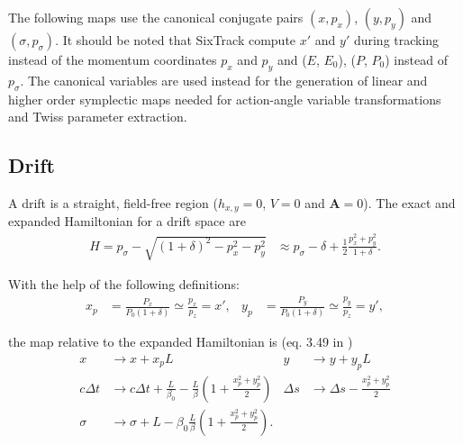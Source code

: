 \documentclass[english]{article}
\begin{document}
The following maps use the canonical conjugate pairs $(x,p_x)$, $(y,p_y)$ 
and $(\sigma,p_\sigma)$. It should be noted that SixTrack compute $x'$ and $y'$
during tracking instead of the momentum coordinates $p_x$ and $p_y$ and ($E$,
$E_0$), ($P$, $P_0$) instead of $p_\sigma$. The canonical variables are
used instead for the generation of linear and higher order symplectic maps
needed for action-angle variable transformations and Twiss parameter extraction.


\subsection{Drift}
A drift is a straight, field-free region ($h_{x,y}=0$, $V=0$ and
$\mathbf{A}=0$).  The exact and expanded Hamiltonian for a drift space are
\begin{align}
  H = p_\sigma - \sqrt{(1+\delta)^2 - p_x^2 - p_y^2} &\approx
  p_\sigma - \delta + \frac{1}{2}\frac{p_x^2+p_y^2}{1+\delta}.
\end{align}

With the help of the following definitions:
\begin{align}
   x_p&=\frac{P_x}{P_0 (1+\delta)}\simeq\frac{p_x}{p_z}=x', &
   y_p&=\frac{P_y}{P_0 (1+\delta)}\simeq\frac{p_y}{p_z}=y', %
\end{align}


the map relative to the expanded Hamiltonian is (eq. 3.49 in \cite{ripken95})
\begin{align}
  x & \to x + x_p L &
  y & \to y + y_p L\\
  c\Delta t & \to c\Delta t + \frac{L}{\beta_0} - \frac{L}{\beta} 
  \left(1+\frac{x_p^2+y_p^2}{2}  \right) &
  \Delta s & \to \Delta s -\frac{x_p^2+y_p^2}{2} \\
  \sigma & \to \sigma +
  L - \beta_0 \frac{L}\beta
        \left( 1+\frac{x_p^2+y_p^2}{2}  \right)  .
\end{align}
\end{document}
